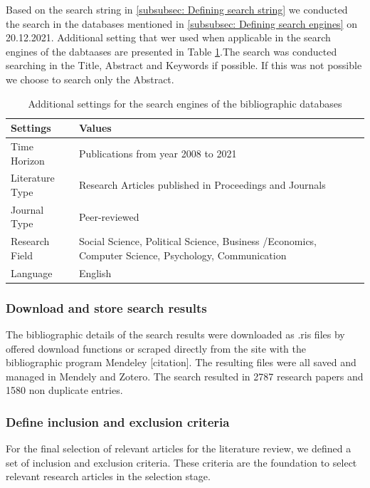 Based on the search string in \ref{subsubsec: Defining search string} we conducted the search in the databases mentioned in \ref{subsubsec: Defining search engines} on 20.12.2021. Additional setting that wer used when applicable in the search engines of the dabtaases are presented in Table \ref{tab: search settings}.The search was conducted searching in the Title, Abstract and Keywords if possible. If this was not possible we choose to search only the Abstract.

\begin{table}
	\caption{Additional settings for the search engines of the bibliographic databases}
	\centering
	\begin{tabular}{ll}
		\toprule
		Settings     & Values \\
		\midrule
		Time Horizon & Publications from year 2008 to 2021 \\ 
		Literature Type & Research Articles published in Proceedings and  Journals \\
		Journal Type & Peer-reviewed \\
		Research Field & Social Science, Political Science, Business /Economics, Computer Science, Psychology, Communication \\
		Language & English \\
		\bottomrule 
	\end{tabular}
	\label{tab: search settings}
\end{table} 

\subsubsection{Download and store search results}

The bibliographic details of the search results were downloaded as .ris files by offered download functions or scraped directly from the site with the bibliographic program Mendeley [citation]. The resulting files were all saved and managed in Mendely and Zotero. The search resulted in 2787 research papers and 1580 non duplicate entries.

\subsubsection{Define inclusion and exclusion criteria}

For the final selection of relevant articles for the literature review, we defined a set of inclusion and exclusion criteria. These criteria are the foundation to select relevant research articles in the selection stage.

